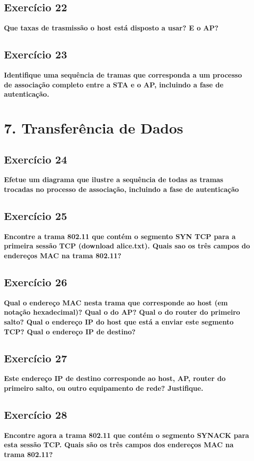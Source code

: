 \documentclass[a4paper]{report}
\begin{document}
\section{Exercício 22}
\textbf{Que taxas de trasmissão o host está disposto a usar? E o AP?}

\section{Exercício 23}
\textbf{Identifique uma sequência de tramas que corresponda a um processo de
    associação completo entre a STA e o AP, incluindo a fase de autenticação.}

\chapter{7. Transferência de Dados}
\section{Exercício 24}
\textbf{Efetue um diagrama que ilustre a sequência de todas as tramas trocadas
    no processo de associação, incluindo a fase de autenticação}

\section{Exercício 25}
\textbf{Encontre a trama 802.11 que contém o segmento SYN TCP para a primeira
    sessão TCP (download alice.txt). Quais sao os três campos do endereços MAC
    na trama 802.11?}

\section{Exercício 26}
\textbf{Qual o endereço MAC nesta trama que corresponde ao host (em notação
    hexadecimal)? Qual o do AP? Qual o do router do primeiro salto? Qual o
    endereço IP do host que está a enviar este segmento TCP? Qual o endereço IP
    de destino?}

\section{Exercício 27}
\textbf{Este endereço IP de destino corresponde ao host, AP, router do primeiro
    salto, ou outro equipamento de rede? Justifique.}

\section{Exercício 28}
\textbf{Encontre agora a trama 802.11 que contém o segmento SYNACK para esta
    sessão TCP. Quais são os três campos dos endereços MAC na trama 802.11?}
\end{document}
